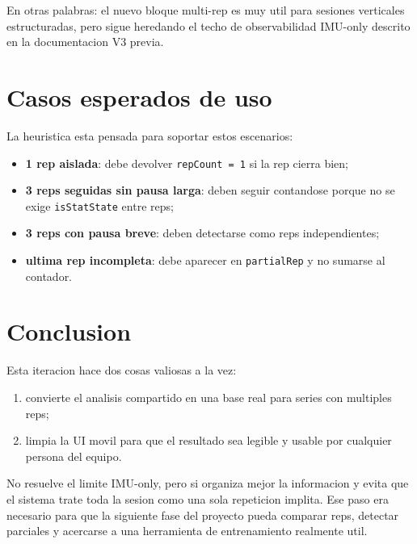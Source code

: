 \documentclass[11pt,a4paper]{article}
\begin{document}
En otras palabras: el nuevo bloque multi-rep es muy util para sesiones verticales estructuradas, pero sigue heredando el techo de observabilidad IMU-only descrito en la documentacion V3 previa.

\section{Casos esperados de uso}
La heuristica esta pensada para soportar estos escenarios:
\begin{itemize}[leftmargin=14pt]
  \item \textbf{1 rep aislada}: debe devolver \texttt{repCount = 1} si la rep cierra bien;
  \item \textbf{3 reps seguidas sin pausa larga}: deben seguir contandose porque no se exige \texttt{isStatState} entre reps;
  \item \textbf{3 reps con pausa breve}: deben detectarse como reps independientes;
  \item \textbf{ultima rep incompleta}: debe aparecer en \texttt{partialRep} y no sumarse al contador.
\end{itemize}

\section*{Conclusion}
Esta iteracion hace dos cosas valiosas a la vez:
\begin{enumerate}[leftmargin=16pt]
  \item convierte el analisis compartido en una base real para series con multiples reps;
  \item limpia la UI movil para que el resultado sea legible y usable por cualquier persona del equipo.
\end{enumerate}

No resuelve el limite IMU-only, pero si organiza mejor la informacion y evita que el sistema trate toda la sesion como una sola repeticion implita. Ese paso era necesario para que la siguiente fase del proyecto pueda comparar reps, detectar parciales y acercarse a una herramienta de entrenamiento realmente util.
\end{document}
